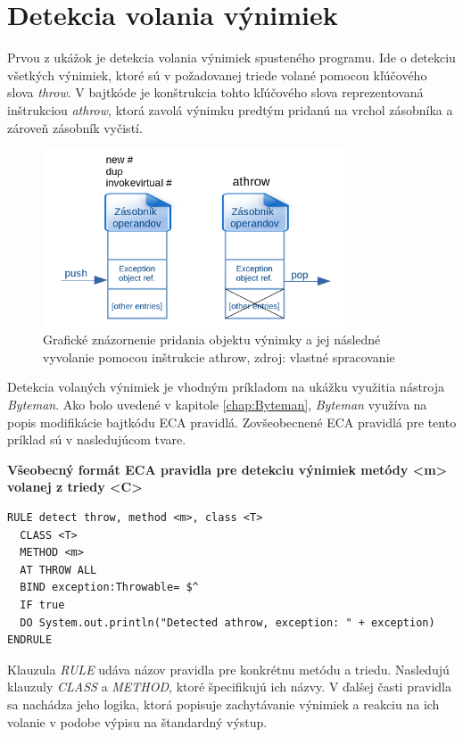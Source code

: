 \documentclass[11pt,final,oneside]{fithesis}
\newenvironment{example}[1]
{
\vspace{3mm}
\noindent\textbf{#1}
\vspace{2mm}
}
{
\vspace{3mm}
}
\begin{document}
\section{Detekcia volania výnimiek}
Prvou z ukážok je detekcia volania výnimiek spusteného programu. Ide o detekciu
všetkých výnimiek, ktoré sú v požadovanej triede volané pomocou kľúčového slova
\textit{throw}. V bajtkóde je konštrukcia tohto kľúčového slova reprezentovaná 
inštrukciou \textit{athrow}, ktorá zavolá výnimku predtým pridanú na vrchol 
zásobníka a zároveň zásobník vyčistí.

\begin{figure}[H]
  \centering
   \includegraphics[width=0.80\textwidth]{throw.png}
  \caption{Grafické znázornenie pridania objektu výnimky a jej následné 
  vyvolanie pomocou inštrukcie athrow, zdroj: vlastné spracovanie}
  \label{fig:throw}
\end{figure}

Detekcia volaných výnimiek je vhodným príkladom na ukážku využitia nástroja 
\textit{Byteman}. Ako bolo uvedené v kapitole \ref{chap:Byteman}, 
\textit{Byteman} využíva na popis modifikácie bajtkódu ECA pravidlá. 
Zovšeobecnené ECA pravidlá pre tento príklad sú v nasledujúcom tvare.

\begin{example}{Všeobecný formát ECA pravidla pre detekciu výnimiek metódy <m> 
volanej z triedy <C>}
\begin{verbatim}
RULE detect throw, method <m>, class <T>
  CLASS <T>
  METHOD <m>
  AT THROW ALL
  BIND exception:Throwable= $^
  IF true
  DO System.out.println("Detected athrow, exception: " + exception)
ENDRULE
\end{verbatim}
\end{example}

Klauzula \textit{RULE} udáva názov pravidla pre konkrétnu metódu a triedu. 
Nasledujú klauzuly \textit{CLASS} a \textit{METHOD}, ktoré špecifikujú ich 
názvy. V ďalšej časti pravidla sa nachádza jeho logika, ktorá popisuje 
zachytávanie výnimiek a reakciu na ich volanie v podobe výpisu na štandardný 
výstup.
\end{document}
